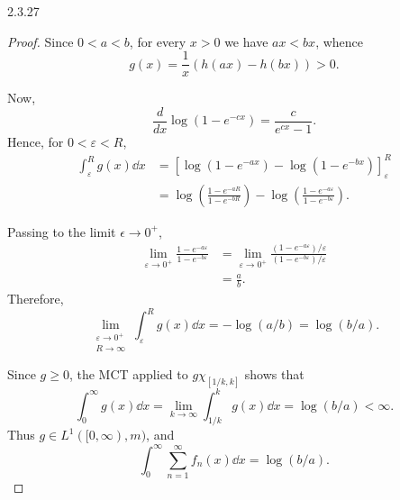 \documentclass[11pt]{article}
\begin{document}
\begin{problem}{2.3.27}
\begin{enumerate}[label=(\alph*)]
\begin{proof}
        Since \( 0<a<b \), for every \( x>0 \) we have \( ax<bx \),
        whence
        \begin{equation}
          \label{eq:p2327-nonnegative}
          g(x)=\frac{1}{x}\left(h(ax)-h(bx)\right)>0.
        \end{equation}

        Now,
        \begin{equation}
          \label{eq:p2327-antiderivative}
          \frac{d}{dx}\log(1-e^{-cx})
          =\frac{c}{e^{cx}-1}.
        \end{equation}
        Hence, for \( 0<\varepsilon<R \),
        \begin{equation}
          \label{eq:p2327-compact-integral}
          \begin{aligned}
            \int_\varepsilon^R g(x)\dd{x}
            &= \left[
                \log(1-e^{-ax})-\log(1-e^{-bx})
               \right]_\varepsilon^R \\
            &= \log\left(\frac{1-e^{-aR}}{1-e^{-bR}}\right)
               -\log\left(
                 \frac{1-e^{-a\varepsilon}}
                      {1-e^{-b\varepsilon}}
               \right).
          \end{aligned}
        \end{equation}

        Passing to the limit \( \epsilon\to0^{+} \),
        \begin{equation}
          \label{eq:p2327-limit}
          \begin{aligned}
            \lim_{\varepsilon\to0^+}
            \frac{1-e^{-a\varepsilon}}
                 {1-e^{-b\varepsilon}}
            &= \lim_{\varepsilon\to0^+}
               \frac{(1-e^{-a\varepsilon})/\varepsilon}
                    {(1-e^{-b\varepsilon})/\varepsilon} \\
            &= \frac{a}{b}.
          \end{aligned}
        \end{equation}
        Therefore,
        \begin{equation}
          \label{eq:p2327-final}
          \lim_{\substack{\varepsilon\to0^+\\R\to\infty}}
          \int_\varepsilon^R g(x)\dd{x}
          = -\log(a/b)
          = \log(b/a).
        \end{equation}

        Since \( g \geq 0 \), the MCT
        applied to \( g\chi_{[1/k,k]} \) shows that
        \begin{equation}
          \label{eq:p2327-mct}
          \int_0^\infty g(x)\dd{x}
          = \lim_{k\to\infty}\int_{1/k}^k g(x)\dd{x}
          = \log(b/a)<\infty.
        \end{equation}
        Thus \( g\in L^1([0,\infty),m) \), and
        \begin{equation}
          \label{eq:p2327-conclusion}
          \int_0^\infty\sum_{n=1}^\infty f_n(x)\dd{x}
          =\log(b/a).
        \end{equation}
      \end{proof}
  \end{enumerate}
\end{problem}
\end{document}
